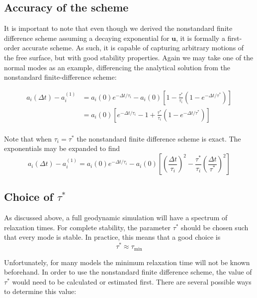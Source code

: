 \documentclass[preprint,12pt,authoryear]{elsarticle}
\begin{document}
\subsection{Accuracy of the scheme}
It is important to note that even though we derived the nonstandard finite difference scheme assuming a decaying exponential
for $\mathbf{u}$, it is formally a first-order accurate scheme. As such, it is capable of capturing arbitrary motions 
of the free surface, but with good stability properties.
Again we may take one of the normal modes as an example, differencing the analytical solution from the nonstandard finite-difference scheme:

\begin{equation}
\begin{aligned}
a_i(\Delta t) - a_i^{(1)} &= a_i(0) e^{-\Delta t/\tau_i} - a_i{(0)} \left[ 1 - \frac{\tau^*}{\tau_i} \left(1-e^{-\Delta t/\tau^*} \right) \right] \\
                          &= a_i{(0)} \left[ e^{-\Delta t/\tau_i} - 1 + \frac{\tau^*}{\tau_i} \left(1-e^{-\Delta t/\tau^*} \right) \right] \\
\end{aligned}
\end{equation}

Note that when $\tau_i = \tau^*$ the nonstandard finite difference scheme is exact.
The exponentials may be expanded to find
\begin{equation}
a_i(\Delta t) - a_i^{(1)} = a_i(0) e^{-\Delta t/\tau_i} - a_i{(0)} \left[ \left(\frac{\Delta t}{\tau_i}\right)^2 - \frac{\tau^*}{\tau_i} \left(\frac{\Delta t }{\tau^* }\right)^2 \right] 
\end{equation}

\subsection{Choice of $\tau^*$}
As discussed above, a full geodynamic simulation will have a spectrum of relaxation times.
For complete stability, the parameter $\tau^*$ should be chosen such that every mode is stable.
In practice, this means that a good choice is 
\begin{equation}
\tau^* \approx \tau_{\mathrm{min}}
\label{eq:tau_choice}
\end{equation}

Unfortunately, for many models the minimum relaxation time will not be known beforehand. 
In order to use the nonstandard finite difference scheme, the value of $\tau^*$ would need 
to be calculated or estimated first.  There are several possible ways to determine this value:
\end{document}
